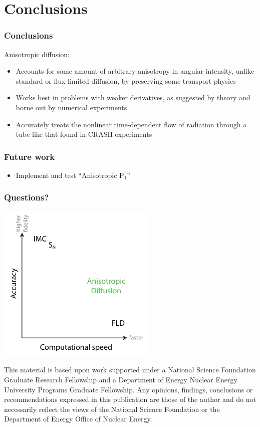 \documentclass{beamer}
\begin{document}
\section{Conclusions}
\begin{frame}
  \frametitle{Conclusions}
  Anisotropic diffusion:
  \begin{itemize}
    \item Accounts for some amount of arbitrary anisotropy in angular
      intensity, unlike standard or flux-limited diffusion, by preserving some
      transport physics
    \item Works best in problems with weaker derivatives, as suggested by
      theory and borne out by numerical experiments
    \item Accurately treats the nonlinear time-dependent flow of radiation
      through a tube like that found in CRASH experiments
  \end{itemize}
\end{frame}
\begin{frame}
  \frametitle{Future work}
  \begin{itemize}
    \item Implement and test ``Anisotropic P$_1$''
  \end{itemize}
\end{frame}
\appendix
\begin{frame}
  \frametitle{Questions?}
\begin{center}
  \includegraphics[width=3in]{../figures/fidelity2}
\end{center}
{\tiny
This material is based upon work supported under a National Science Foundation
Graduate Research Fellowship and a Department of Energy Nuclear Energy
University Programs Graduate Fellowship. Any opinions, findings, conclusions or
recommendations expressed in this publication are those of the author and do
not necessarily reflect the views of the National Science Foundation or the
Department of Energy Office of Nuclear Energy.}
\end{frame}
\end{document}
